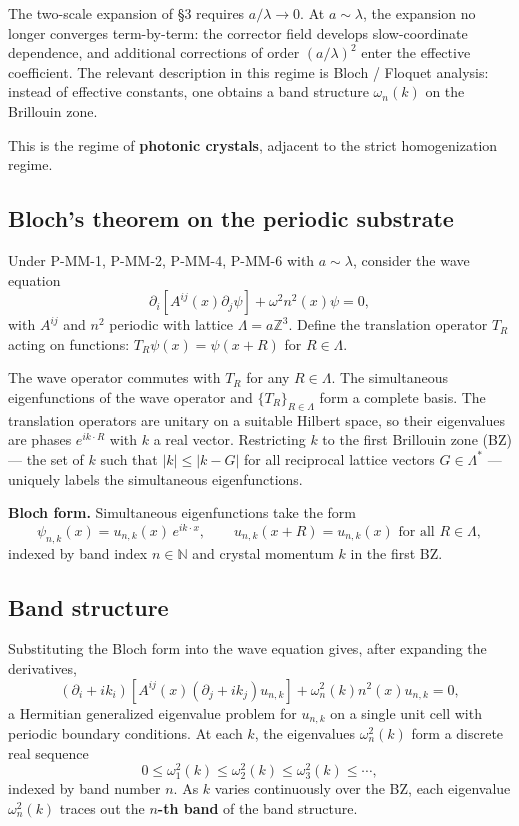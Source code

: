 \documentclass[11pt,a4paper]{article}
\begin{document}
The two-scale expansion of \S3 requires $a/\lambda \to 0$. At $a \sim \lambda$, the expansion no longer converges term-by-term: the corrector field develops slow-coordinate dependence, and additional corrections of order $(a/\lambda)^2$ enter the effective coefficient. The relevant description in this regime is Bloch / Floquet analysis: instead of effective constants, one obtains a band structure $\omega_n(k)$ on the Brillouin zone.

This is the regime of \textbf{photonic crystals}, adjacent to the strict homogenization regime.

\subsection{Bloch's theorem on the periodic substrate}

Under P-MM-1, P-MM-2, P-MM-4, P-MM-6 with $a \sim \lambda$, consider the wave equation
\[
\partial_i\!\left[A^{ij}(x)\partial_j\psi\right] + \omega^2 n^2(x)\psi = 0,
\]
with $A^{ij}$ and $n^2$ periodic with lattice $\Lambda = a\mathbb{Z}^3$. Define the translation operator $T_R$ acting on functions: $T_R\psi(x) = \psi(x + R)$ for $R \in \Lambda$.

The wave operator commutes with $T_R$ for any $R \in \Lambda$. The simultaneous eigenfunctions of the wave operator and $\{T_R\}_{R\in\Lambda}$ form a complete basis. The translation operators are unitary on a suitable Hilbert space, so their eigenvalues are phases $e^{ik\cdot R}$ with $k$ a real vector. Restricting $k$ to the first Brillouin zone (BZ) --- the set of $k$ such that $|k| \le |k - G|$ for all reciprocal lattice vectors $G \in \Lambda^*$ --- uniquely labels the simultaneous eigenfunctions.

\textbf{Bloch form.} Simultaneous eigenfunctions take the form
\[
\boxed{\psi_{n, k}(x) = u_{n, k}(x)\,e^{i k\cdot x}, \qquad u_{n, k}(x + R) = u_{n, k}(x) \text{ for all } R \in \Lambda,}
\]
indexed by band index $n \in \mathbb{N}$ and crystal momentum $k$ in the first BZ.

\subsection{Band structure}

Substituting the Bloch form into the wave equation gives, after expanding the derivatives,
\[
(\partial_i + i k_i)\!\left[A^{ij}(x)(\partial_j + i k_j) u_{n, k}\right] + \omega_n^2(k) n^2(x) u_{n, k} = 0,
\]
a Hermitian generalized eigenvalue problem for $u_{n, k}$ on a single unit cell with periodic boundary conditions. At each $k$, the eigenvalues $\omega_n^2(k)$ form a discrete real sequence
\[
0 \le \omega_1^2(k) \le \omega_2^2(k) \le \omega_3^2(k) \le \cdots,
\]
indexed by band number $n$. As $k$ varies continuously over the BZ, each eigenvalue $\omega_n^2(k)$ traces out the \textbf{$n$-th band} of the band structure.
\end{document}
